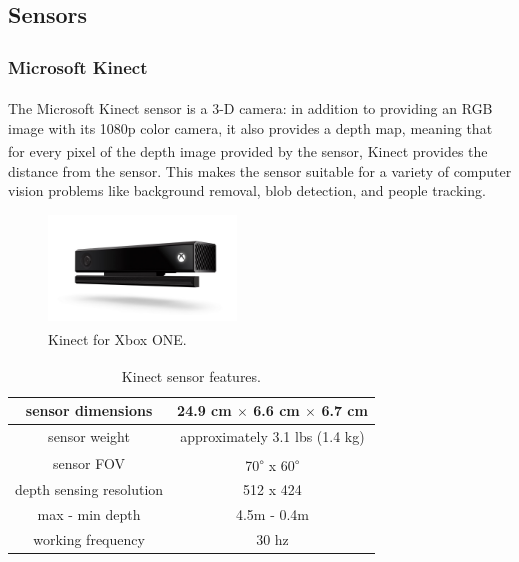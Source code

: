 \subsection{Sensors}
\subsubsection{Microsoft Kinect\textsuperscript{\textregistered}\label{sec:kinectsec}}
The Microsoft Kinect\textsuperscript{\textregistered} sensor is a 3-D camera: in addition to providing an RGB image with its 1080p color camera, it also provides a depth map,  meaning that for every pixel of the depth image provided by the sensor, Kinect\textsuperscript{\textregistered} provides the distance from the sensor. This makes the sensor suitable for a variety of computer vision problems like background removal, blob detection, and people tracking.

\begin{figure}[H]
	\centering
	\includegraphics[width=5cm]{images/03-foundation/kinect}
	\caption{Kinect\textsuperscript{\textregistered} for Xbox ONE.}
	\label{kinect} 
\end{figure}

\begin{table}[H]
\begin{center}
	\begin{tabular}{|c|c|}
		\hline
		sensor dimensions & 24.9 cm $\times$ 6.6 cm $\times$ 6.7 cm\\
		\hline
		sensor weight & approximately 3.1 lbs (1.4 kg) \\
		\hline
		sensor FOV & 70\textsuperscript{$\circ$} x 60\textsuperscript{$\circ$} \\
		\hline
		depth sensing resolution & 512 x 424 \\
		\hline
		max - min depth & 4.5m - 0.4m \\ 
		\hline
		working frequency & 30 hz \\
		\hline 
	\end{tabular}
\end{center}
\caption{Kinect\textsuperscript{\textregistered} sensor features.}
\label{kinectfeatures}
\end{table}

